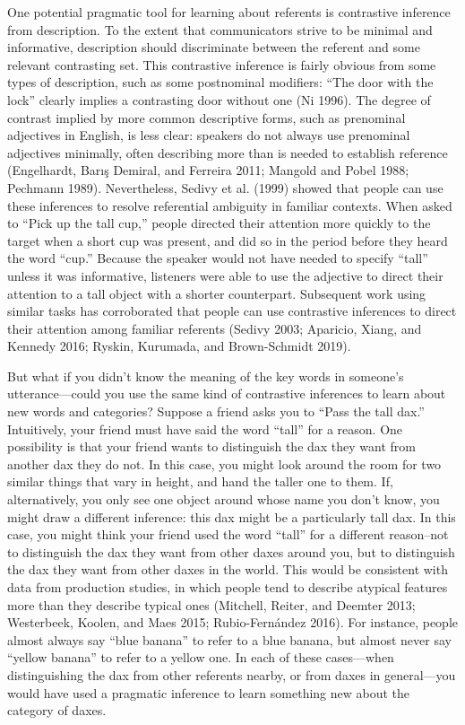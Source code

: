 \documentclass{ucetd}
\begin{document}
One potential pragmatic tool for learning about referents is contrastive
inference from description. To the extent that communicators strive to
be minimal and informative, description should discriminate between the
referent and some relevant contrasting set. This contrastive inference
is fairly obvious from some types of description, such as some
postnominal modifiers: ``The door with the lock'' clearly implies a
contrasting door without one (Ni 1996). The degree of contrast implied
by more common descriptive forms, such as prenominal adjectives in
English, is less clear: speakers do not always use prenominal adjectives
minimally, often describing more than is needed to establish reference
(Engelhardt, Barış Demiral, and Ferreira 2011; Mangold and Pobel 1988;
Pechmann 1989). Nevertheless, Sedivy et al. (1999) showed that people
can use these inferences to resolve referential ambiguity in familiar
contexts. When asked to ``Pick up the tall cup,'' people directed their
attention more quickly to the target when a short cup was present, and
did so in the period before they heard the word ``cup.'' Because the
speaker would not have needed to specify ``tall'' unless it was
informative, listeners were able to use the adjective to direct their
attention to a tall object with a shorter counterpart. Subsequent work
using similar tasks has corroborated that people can use contrastive
inferences to direct their attention among familiar referents (Sedivy
2003; Aparicio, Xiang, and Kennedy 2016; Ryskin, Kurumada, and
Brown-Schmidt 2019).

But what if you didn't know the meaning of the key words in someone's
utterance---could you use the same kind of contrastive inferences to
learn about new words and categories? Suppose a friend asks you to
``Pass the tall dax.'' Intuitively, your friend must have said the word
``tall'' for a reason. One possibility is that your friend wants to
distinguish the dax they want from another dax they do not. In this
case, you might look around the room for two similar things that vary in
height, and hand the taller one to them. If, alternatively, you only see
one object around whose name you don't know, you might draw a different
inference: this dax might be a particularly tall dax. In this case, you
might think your friend used the word ``tall'' for a different
reason--not to distinguish the dax they want from other daxes around
you, but to distinguish the dax they want from other daxes in the world.
This would be consistent with data from production studies, in which
people tend to describe atypical features more than they describe
typical ones (Mitchell, Reiter, and Deemter 2013; Westerbeek, Koolen,
and Maes 2015; Rubio-Fernández 2016). For instance, people almost always
say ``blue banana'' to refer to a blue banana, but almost never say
``yellow banana'' to refer to a yellow one. In each of these
cases---when distinguishing the dax from other referents nearby, or from
daxes in general---you would have used a pragmatic inference to learn
something new about the category of daxes.
\end{document}
